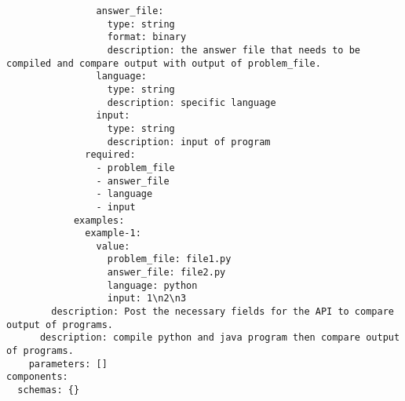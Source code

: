 \begin{lstlisting}
                answer_file:
                  type: string
                  format: binary
                  description: the answer file that needs to be compiled and compare output with output of problem_file.
                language:
                  type: string
                  description: specific language
                input:
                  type: string
                  description: input of program
              required:
                - problem_file
                - answer_file
                - language
                - input
            examples:
              example-1:
                value:
                  problem_file: file1.py
                  answer_file: file2.py
                  language: python
                  input: 1\n2\n3
        description: Post the necessary fields for the API to compare output of programs.
      description: compile python and java program then compare output of programs.
    parameters: []
components:
  schemas: {}

\end{lstlisting}